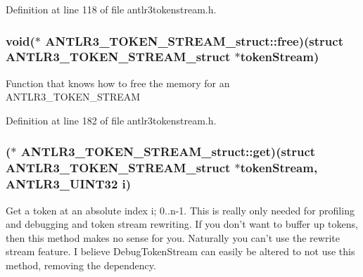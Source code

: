 Definition at line 118 of file antlr3tokenstream.\-h.

\hypertarget{struct_a_n_t_l_r3___t_o_k_e_n___s_t_r_e_a_m__struct_a8037dc687f70300d50abfc5cca904de8}{
\subsubsection[{free}]{\setlength{\rightskip}{0pt plus 5cm}void($\ast$ A\-N\-T\-L\-R3\-\_\-\-T\-O\-K\-E\-N\-\_\-\-S\-T\-R\-E\-A\-M\-\_\-struct\-::free)(struct {\bf A\-N\-T\-L\-R3\-\_\-\-T\-O\-K\-E\-N\-\_\-\-S\-T\-R\-E\-A\-M\-\_\-struct} $\ast$token\-Stream)}}\label{struct_a_n_t_l_r3___t_o_k_e_n___s_t_r_e_a_m__struct_a8037dc687f70300d50abfc5cca904de8}
Function that knows how to free the memory for an A\-N\-T\-L\-R3\-\_\-\-T\-O\-K\-E\-N\-\_\-\-S\-T\-R\-E\-A\-M 

Definition at line 182 of file antlr3tokenstream.\-h.

\hypertarget{struct_a_n_t_l_r3___t_o_k_e_n___s_t_r_e_a_m__struct_af2a69586f103be83f42bd802c2a80c28}{
\subsubsection[{get}]{($\ast$ A\-N\-T\-L\-R3\-\_\-\-T\-O\-K\-E\-N\-\_\-\-S\-T\-R\-E\-A\-M\-\_\-struct\-::get)(struct {\bf A\-N\-T\-L\-R3\-\_\-\-T\-O\-K\-E\-N\-\_\-\-S\-T\-R\-E\-A\-M\-\_\-struct} $\ast$token\-Stream, {\bf A\-N\-T\-L\-R3\-\_\-\-U\-I\-N\-T32} {\bf i})}}\label{struct_a_n_t_l_r3___t_o_k_e_n___s_t_r_e_a_m__struct_af2a69586f103be83f42bd802c2a80c28}
Get a token at an absolute index i; 0..n-\/1. This is really only needed for profiling and debugging and token stream rewriting. If you don't want to buffer up tokens, then this method makes no sense for you. Naturally you can't use the rewrite stream feature. I believe Debug\-Token\-Stream can easily be altered to not use this method, removing the dependency. 

